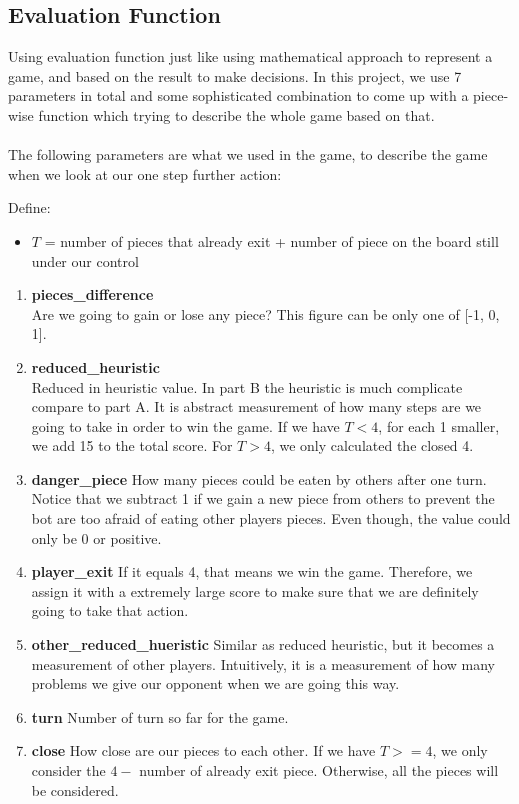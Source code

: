 \documentclass[11pt]{article}
\begin{document}
\subsection{Evaluation Function}
Using evaluation function just like using mathematical approach to represent a game, and based on the result
to make decisions. In this project, we use 7 parameters in total and some sophisticated combination to come up 
with a piece-wise function which trying to describe the whole game based on that.
\\
\\
The following parameters are what we used in the game, to describe the game when we look at our one step further
action:

Define:
\begin{itemize}
  \item $T$ = number of pieces that already exit + number of piece on the board still under our control
\end{itemize}

\begin{enumerate}
  \item \textbf{pieces\_difference} \\
        Are we going to gain or lose any piece? This figure can be only one of [-1, 0, 1].
  \item \textbf{reduced\_heuristic} \\
        Reduced in heuristic value. In part B the heuristic is much complicate compare to part A. It is
        abstract measurement of how many steps are we going to take in order to win the game. If we have 
        $T < 4$, for each 1 smaller, we add 15 to the total score. For $T > 4$, we only calculated the
        closed 4.
  \item \textbf{danger\_piece}
        How many pieces could be eaten by others after one turn. Notice that we subtract 1 if we gain a 
        new piece from others to prevent the bot are too afraid of eating other players pieces. 
        Even though, the value could only be 0 or positive.
  \item \textbf{player\_exit}
        If it equals 4, that means we win the game. Therefore, we assign it with a extremely large score to make sure
        that we are definitely going to take that action.
  \item \textbf{other\_reduced\_hueristic}
        Similar as reduced heuristic, but it becomes a measurement of other players. Intuitively, it is a measurement of
        how many problems we give our opponent when we are going this way.
  \item \textbf{turn}
        Number of turn so far for the game.
  \item \textbf{close}
        How close are our pieces to each other. If we have $T >= 4$, we only consider the $4 - $ number of 
        already exit piece. Otherwise, all the pieces will be considered.
\end{enumerate}
\end{document}
